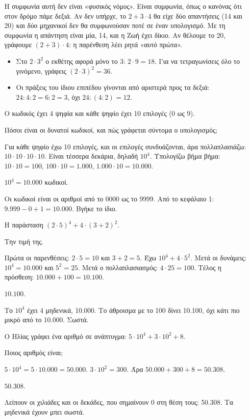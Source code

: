 Η συμφωνία αυτή δεν είναι «φυσικός νόμος». Είναι συμφωνία, όπως ο κανόνας ότι στον δρόμο πάμε δεξιά. Αν δεν υπήρχε, το $2+3\cdot 4$ θα είχε δύο απαντήσεις (14 και 20) και δύο μηχανικοί δεν θα συμφωνούσαν ποτέ σε έναν υπολογισμό. Με τη συμφωνία η απάντηση είναι μία, 14, και η Ζωή έχει δίκιο. Αν θέλουμε το 20, γράφουμε $(2+3)\cdot 4$: η παρένθεση λέει ρητά «αυτό πρώτα».

\begin{prosoxi}
\begin{itemize}[leftmargin=1.2em,itemsep=0.3ex,topsep=2pt]
\item Στο $2\cdot 3^2$ ο εκθέτης αφορά μόνο το 3: $2\cdot 9=18$. Για να τετραγωνίσεις όλο το γινόμενο, γράφεις $(2\cdot 3)^2=36$.
\item Οι πράξεις του ίδιου επιπέδου γίνονται από αριστερά προς τα δεξιά: $24:4:2=6:2=3$, όχι $24:(4:2)=12$.
\end{itemize}
\end{prosoxi}


\tixero Ο κωδικός έχει 4 ψηφία και κάθε ψηφίο έχει 10 επιλογές (0 ως 9).\par
\tithelo Πόσοι είναι οι δυνατοί κωδικοί, και πώς γράφεται σύντομα ο υπολογισμός;\par
\possindeo Για κάθε ψηφίο έχω 10 επιλογές, και οι επιλογές συνδυάζονται, άρα πολλαπλασιάζω: $10\cdot 10\cdot 10\cdot 10$. Είναι τέσσερα δεκάρια, δηλαδή $10^4$. Υπολογίζω βήμα βήμα: $10\cdot 10=100$, $100\cdot 10=1.000$, $1.000\cdot 10=10.000$.\par
\apantisi $10^4=10.000$ κωδικοί.\par
\elegxos Οι κωδικοί είναι οι αριθμοί από το 0000 ως το 9999. Από το κεφάλαιο 1: $9.999-0+1=10.000$. Βγήκε το ίδιο.

\tixero Η παράσταση $(2\cdot 5)^4+4\cdot(3+2)^2$.\par
\tithelo Την τιμή της.\par
\possindeo Πρώτα οι παρενθέσεις: $2\cdot 5=10$ και $3+2=5$. Έχω $10^4+4\cdot 5^2$. Μετά οι δυνάμεις: $10^4=10.000$ και $5^2=25$. Μετά ο πολλαπλασιασμός: $4\cdot 25=100$. Τέλος η πρόσθεση: $10.000+100=10.100$.\par
\apantisi $10.100$.\par
\elegxos Το $10^4$ έχει 4 μηδενικά, 10.000. Το άθροισμα με το 100 δίνει 10.100, όχι κάτι πιο μικρό από το 10.000. Σωστά.

\tixero Ο Ηλίας γράφει ένα αριθμό σε ανάπτυγμα: $5\cdot 10^4+3\cdot 10^2+8$.\par
\tithelo Ποιος αριθμός είναι;\par
\possindeo $5\cdot 10^4=5\cdot 10.000=50.000$. $3\cdot 10^2=300$. Άρα $50.000+300+8=50.308$.\par
\apantisi $50.308$.\par
\elegxos Λείπουν οι χιλιάδες και οι δεκάδες, που σημαίνουν 0 στη θέση τους: 50.308. Τα μηδενικά έχουν μπει σωστά.

